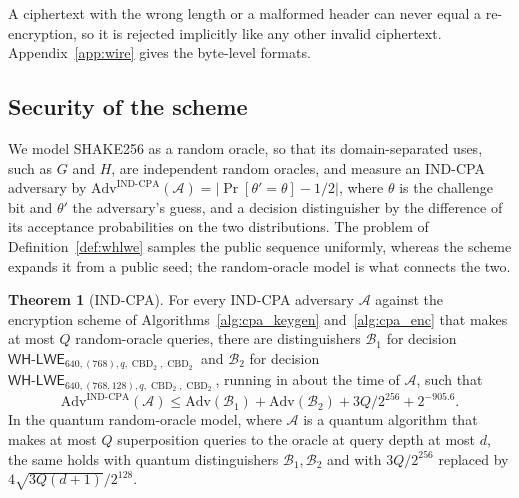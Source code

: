 \documentclass[11pt,a4paper]{article}
\theoremstyle{definition}
\newtheorem{theorem}{Theorem}
\newcommand{\CBD}{\operatorname{CBD}}
\newcommand{\WHLWE}{\textsf{WH-LWE}}
\begin{document}
A ciphertext with the wrong length or a malformed header can never equal a re-encryption, so it is rejected implicitly like any other invalid ciphertext. Appendix~\ref{app:wire} gives the byte-level formats.

\subsection{Security of the scheme}\label{sec:kem-security}
We model SHAKE256 as a random oracle, so that its domain-separated uses, such as $G$ and $H$, are independent random oracles, and measure an IND-CPA adversary by $\mathrm{Adv}^{\mathrm{IND\text{-}CPA}}(\mathcal{A}) = |\Pr[\theta' = \theta] - 1/2|$, where $\theta$ is the challenge bit and $\theta'$ the adversary's guess, and a decision distinguisher by the difference of its acceptance probabilities on the two distributions. The problem of Definition~\ref{def:whlwe} samples the public sequence uniformly, whereas the scheme expands it from a public seed; the random-oracle model is what connects the two.

\begin{theorem}[IND-CPA]\label{thm:cpa}
For every IND-CPA adversary $\mathcal{A}$ against the encryption scheme of Algorithms~\ref{alg:cpa_keygen} and~\ref{alg:cpa_enc} that makes at most $Q$ random-oracle queries, there are distinguishers $\mathcal{B}_1$ for decision $\WHLWE_{640,(768),q,\CBD_2,\CBD_2}$ and $\mathcal{B}_2$ for decision $\WHLWE_{640,(768,128),q,\CBD_2,\CBD_2}$, running in about the time of $\mathcal{A}$, such that
\[
\mathrm{Adv}^{\mathrm{IND\text{-}CPA}}(\mathcal{A}) \le \mathrm{Adv}(\mathcal{B}_1) + \mathrm{Adv}(\mathcal{B}_2) + 3Q/2^{256} + 2^{-905.6}.
\]
In the quantum random-oracle model, where $\mathcal{A}$ is a quantum algorithm that makes at most $Q$ superposition queries to the oracle at query depth at most $d$, the same holds with quantum distinguishers $\mathcal{B}_1, \mathcal{B}_2$ and with $3Q/2^{256}$ replaced by $4\sqrt{3Q(d + 1)}/2^{128}$.
\end{theorem}
\end{document}
